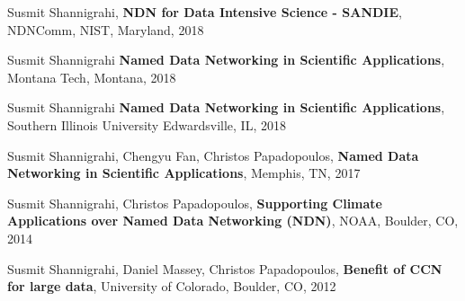 \begin{etaremune}
\item Susmit Shannigrahi, \textbf{NDN for Data Intensive Science - SANDIE}, NDNComm, NIST, Maryland, 2018

\item Susmit Shannigrahi  \textbf{Named Data Networking in Scientific Applications}, Montana Tech, Montana, 2018

\item Susmit Shannigrahi  \textbf{Named Data Networking in Scientific Applications}, Southern Illinois University Edwardsville, IL, 2018

\item Susmit Shannigrahi, Chengyu Fan, Christos Papadopoulos,  \textbf{Named Data Networking in Scientific Applications}, Memphis, TN, 2017

\item Susmit Shannigrahi, Christos Papadopoulos, \textbf{Supporting Climate Applications over Named Data Networking (NDN)}, NOAA, Boulder, CO, 2014

\item Susmit Shannigrahi, Daniel Massey, Christos Papadopoulos, \textbf{Benefit of CCN for large data}, University of Colorado, Boulder, CO, 2012


\end{etaremune}
\vspace{2em}
